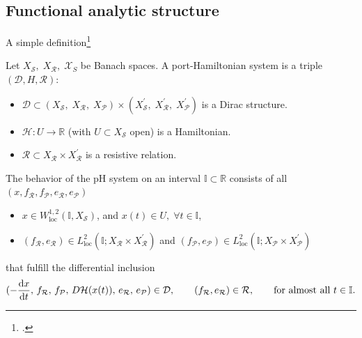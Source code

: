 \documentclass[aspectratio=169]{beamer}
\newcommand{\bbR}{\mathbb{R}}
\newcommand{\bbI}{\mathbb{I}}
\begin{document}
\subsection{Functional analytic structure}

\begin{frame}{A simple definition\footcite{reis2021pH}}
	\begin{definition}
		Let $X_\mathcal{S}, \; X_\mathcal{R}, \; \mathcal{X}_S$ be Banach spaces. A port-Hamiltonian system is a triple $(\mathcal{D}, H, \mathcal{R})$:
		\begin{itemize}
			\item $\mathcal{D} \subset (X_\mathcal{S}, \; X_\mathcal{R}, \; X_\mathcal{P}) \times (X^{'}_\mathcal{S}, \; X^{'}_\mathcal{R}, \; X^{'}_\mathcal{P})$ is a Dirac structure.
			\item $\mathcal{H} : U \rightarrow \bbR$ (with $U \subset X_\mathcal{S}$ open) is a Hamiltonian.
			\item $\mathcal{R}\subset X_\mathcal{R} \times X_{\mathcal{R}}^{'}$ is a resistive relation.
		\end{itemize}
		The behavior of the pH system on an interval $\mathbb{I} \subset \bbR$ consists of all $(x, f_{\mathcal{R}}, f_{\mathcal{P}} , e_{\mathcal{R}}, e_{\mathcal{P}})$
		\begin{itemize}
			\item 	$x \in W^{1,2}_{\text{loc}}(\mathbb{I}, X_{\mathcal{S}})$, and $x(t) \in U, \; \forall t \in \bbI$, 
			\item $(f_\mathcal{R}, e_\mathcal{R}) \in L^2_{\text{loc}}(\bbI; X_{\mathcal{R}} \times X^{'}_{\mathcal{R}})$ and $(f_\mathcal{P}, e_\mathcal{P}) \in L^2_{\text{loc}}(\bbI; X_{\mathcal{P}} \times X^{'}_{\mathcal{P}})$
		\end{itemize}
		that fulfill the differential inclusion
		\begin{equation*}
			(-\diff{x}{t},\, f_{\mathcal{R}},\, f_{\mathcal{P}},\, D\mathcal{H}(x(t)),\, e_{\mathcal{R}},\, e_{\mathcal{P}}) \in \mathcal{D}, \qquad (f_\mathcal{R}, e_\mathcal{R}) \in \mathcal{R}, \qquad \text{for almost all } t \in \bbI.
		\end{equation*}
	\end{definition}
\end{frame}
\end{document}
